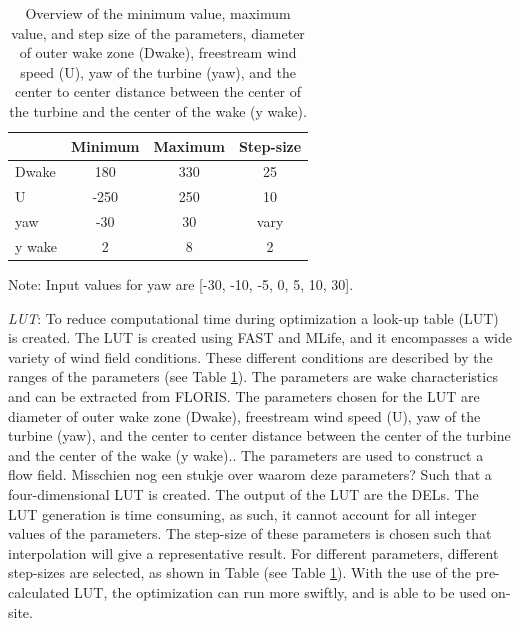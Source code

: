 \documentclass[twoside,twocolumn]{article}
\begin{document}
\begin{table}[h]
	\caption{Overview of the minimum value, maximum value, and step size of the parameters, diameter of outer wake zone (Dwake), freestream wind speed (U), yaw of the turbine (yaw), and the center to center distance between the center of the turbine and the center of the wake (y wake).}
	\centering
	\label{tab:pars}
	\begin{tabular}{lccc}
	\hline
	 & Minimum & Maximum & Step-size \\ 
	\hline
	Dwake & 180 & 330 & 25 \\
	U & -250 & 250 & 10 \\
	yaw & -30 & 30 & vary \\
	y wake & 2 & 8 & 2 \\
	\hline
	\end{tabular}

Note: Input values for yaw are [-30, -10, -5, 0, 5, 10, 30].
\end{table}


\textit{LUT}: To reduce computational time during optimization a look-up table (LUT) is created. The LUT is created using FAST and MLife, and it encompasses a wide variety of wind field conditions. 
These different conditions are described by the ranges of the parameters (see Table \ref{tab:pars}). The parameters are wake characteristics and can be extracted from FLORIS. The parameters chosen for the LUT are diameter of outer wake zone (Dwake), freestream wind speed (U), yaw of the turbine (yaw), and the center to center distance between the center of the turbine and the center of the wake (y wake).. The parameters are used to construct a flow field. Misschien nog een stukje over waarom deze parameters? Such that a four-dimensional LUT is created. The output of the LUT are the DELs. The LUT generation is time consuming, as such, it cannot account for all integer values of the parameters. The step-size of these parameters is chosen such that interpolation will give a representative result. For different parameters, different step-sizes are selected, as shown in Table (see Table \ref{tab:pars}). With the use of the pre-calculated LUT, the optimization can run more swiftly, and is able to be used on-site.
\end{document}

